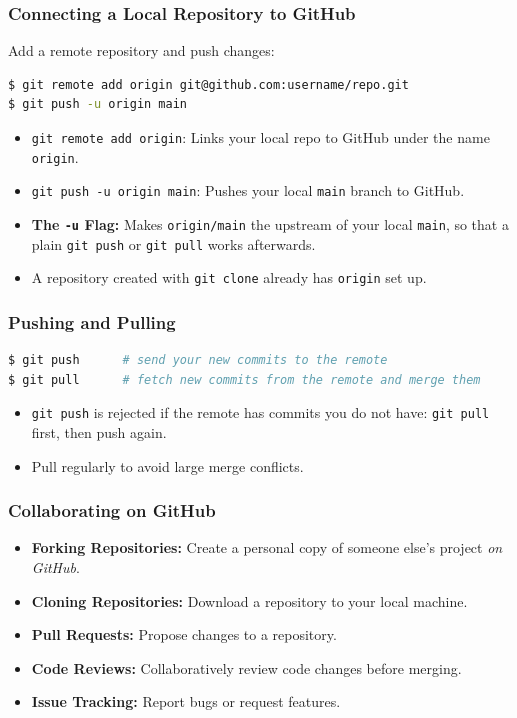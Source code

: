 \begin{frame}[fragile]
	\frametitle{Connecting a Local Repository to GitHub}
	Add a remote repository and push changes:
\begin{lstlisting}[language=bash]
$ git remote add origin git@github.com:username/repo.git
$ git push -u origin main
\end{lstlisting}
	\begin{itemize}
		\item \texttt{git remote add origin}: Links your local repo to GitHub under the name \texttt{origin}.
		\item \texttt{git push -u origin main}: Pushes your local \texttt{main} branch to GitHub.
		\item \textbf{The \texttt{-u} Flag:} Makes \texttt{origin/main} the upstream of your local \texttt{main}, so that a plain \texttt{git push} or \texttt{git pull} works afterwards.
		\item A repository created with \texttt{git clone} already has \texttt{origin} set up.
	\end{itemize}
\end{frame}

\begin{frame}[fragile]
	\frametitle{Pushing and Pulling}
\begin{lstlisting}[language=bash]
$ git push      # send your new commits to the remote
$ git pull      # fetch new commits from the remote and merge them
\end{lstlisting}
	\begin{itemize}
		\item \texttt{git push} is rejected if the remote has commits you do not have: \texttt{git pull} first, then push again.
		\item Pull regularly to avoid large merge conflicts.
	\end{itemize}
\end{frame}

\begin{frame}
	\frametitle{Collaborating on GitHub}
	\begin{itemize}
		\item \textbf{Forking Repositories:} Create a personal copy of someone else's project \emph{on GitHub}.
		\item \textbf{Cloning Repositories:} Download a repository to your local machine.
		\item \textbf{Pull Requests:} Propose changes to a repository.
		\item \textbf{Code Reviews:} Collaboratively review code changes before merging.
		\item \textbf{Issue Tracking:} Report bugs or request features.
	\end{itemize}
\end{frame}

